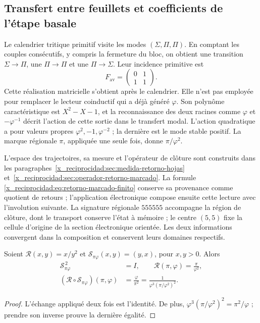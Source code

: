 

\subsection{Transfert entre feuillets et coefficients de l'étape basale}

Le calendrier tritique primitif visite les modes
\((\Sigma,\Pi,\Pi)\). En comptant les couples consécutifs, y compris la
fermeture du bloc, on obtient une transition \(\Sigma\to\Pi\), une
\(\Pi\to\Pi\) et une \(\Pi\to\Sigma\). Leur incidence primitive est
\[
 F_{\mathrm{av}}=\begin{pmatrix}0&1\\1&1\end{pmatrix}.
\]
Cette réalisation matricielle s'obtient après le calendrier. Elle n'est pas employée pour remplacer le lecteur coinductif qui a déjà généré \(\varphi\). Son polynôme caractéristique est \(X^2-X-1\), et la reconnaissance des deux racines comme \(\varphi\) et \(-\varphi^{-1}\) décrit l'action de cette sortie dans le transfert modal. L'action quadratique a pour valeurs propres \(\varphi^2,-1,\varphi^{-2}\) ; la dernière est le mode stable positif. La marque régionale \(\pi\), appliquée une seule fois, donne \(\pi/\varphi^2\).

L'espace des trajectoires, sa mesure et l'opérateur de clôture sont
construits dans les paragraphes~\ref{x_reciprocidad:sec:medida-retorno-hojas}
et~\ref{x_reciprocidad:sec:operador-retorno-marcado}. La formule
\eqref{x_reciprocidad:eq:retorno-marcado-finito} conserve sa provenance comme quotient
de retours ; l'application électronique compose ensuite cette lecture
avec l'involution suivante. La signature régionale \(555555\) accompagne
la région de clôture, dont le transport conserve l'état à mémoire ;
le centre \((5,5)\) fixe la cellule d'origine de la section électronique
orientée. Les deux informations convergent dans la composition et conservent
leurs domaines respectifs.

\begin{lemma}
Soient \(\mathcal R(x,y)=x/y^2\) et
\(\mathscr S_{\pi\varphi}(x,y)=(y,x)\), pour \(x,y>0\).
Alors
\begin{equation}
 \begin{aligned}
 \mathscr S_{\pi\varphi}^{\,2}&=I,\qquad
 \mathcal R(\pi,\varphi)=\frac{\pi}{\varphi^2},\\
 (\mathcal R\circ\mathscr S_{\pi\varphi})(\pi,\varphi)
 &=\frac{\varphi}{\pi^2}
 =\frac1{\varphi^3(\pi/\varphi^2)^2}.
 \end{aligned}
 \label{x_reciprocidad:eq:el-bisagra}
\end{equation}
\end{lemma}
\begin{proof}
L'échange appliqué deux fois est l'identité. De plus,
\(\varphi^3(\pi/\varphi^2)^2=\pi^2/\varphi\) ; prendre son inverse prouve
la dernière égalité.
\end{proof}

